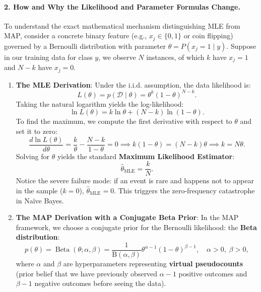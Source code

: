 \paragraph{2. How and Why the Likelihood and Parameter Formulas Change.}
To understand the exact mathematical mechanism distinguishing MLE from MAP, consider a concrete binary feature (e.g., $x_j \in \{0, 1\}$ or coin flipping) governed by a Bernoulli distribution with parameter $\theta = P(x_j = 1 \mid y)$. Suppose in our training data for class $y$, we observe $N$ instances, of which $k$ have $x_j = 1$ and $N - k$ have $x_j = 0$.

\begin{enumerate}
  \item \textbf{The MLE Derivation}:
  Under the i.i.d. assumption, the data likelihood is:
  \begin{equation}
  L(\theta) = p(\mathcal{D} \mid \theta) = \theta^k (1 - \theta)^{N - k}.
  \end{equation}
  Taking the natural logarithm yields the log-likelihood:
  \begin{equation}
  \ln L(\theta) = k \ln \theta + (N - k) \ln (1 - \theta).
  \end{equation}
  To find the maximum, we compute the first derivative with respect to $\theta$ and set it to zero:
  \begin{equation}
  \frac{d \ln L(\theta)}{d\theta} = \frac{k}{\theta} - \frac{N - k}{1 - \theta} = 0 \implies k(1 - \theta) = (N - k)\theta \implies k = N\theta.
  \end{equation}
  Solving for $\theta$ yields the standard \textbf{Maximum Likelihood Estimator}:
  \begin{equation}
  \hat{\theta}_{\text{MLE}} = \frac{k}{N}.
  \label{eq:mle_bernoulli_solution}
  \end{equation}
  Notice the severe failure mode: if an event is rare and happens not to appear in the sample ($k = 0$), $\hat{\theta}_{\text{MLE}} = 0$. This triggers the zero-frequency catastrophe in Naïve Bayes.

  \item \textbf{The MAP Derivation with a Conjugate Beta Prior}:
  In the MAP framework, we choose a conjugate prior for the Bernoulli likelihood: the \textbf{Beta distribution}:
  \begin{equation}
  p(\theta) = \operatorname{Beta}(\theta; \alpha, \beta) = \frac{1}{\mathrm{B}(\alpha, \beta)} \theta^{\alpha - 1} (1 - \theta)^{\beta - 1}, \quad \alpha > 0, \; \beta > 0,
  \end{equation}
  where $\alpha$ and $\beta$ are hyperparameters representing \textbf{virtual pseudocounts} (prior belief that we have previously observed $\alpha - 1$ positive outcomes and $\beta - 1$ negative outcomes before seeing the data).
  

\end{enumerate}
